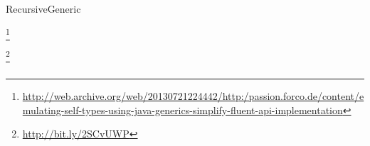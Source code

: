 \begin{pattern}{RecursiveGeneric}


\footnote{\url{http://web.archive.org/web/20130721224442/http:/passion.forco.de/content/emulating-self-types-using-java-generics-simplify-fluent-api-implementation}}

\instances{}

\footnote{\url{http://bit.ly/2SCvUWP}}

\begin{verbatim}

\end{verbatim}

\detection{}

\discussion{}

\related{}

\end{pattern}
